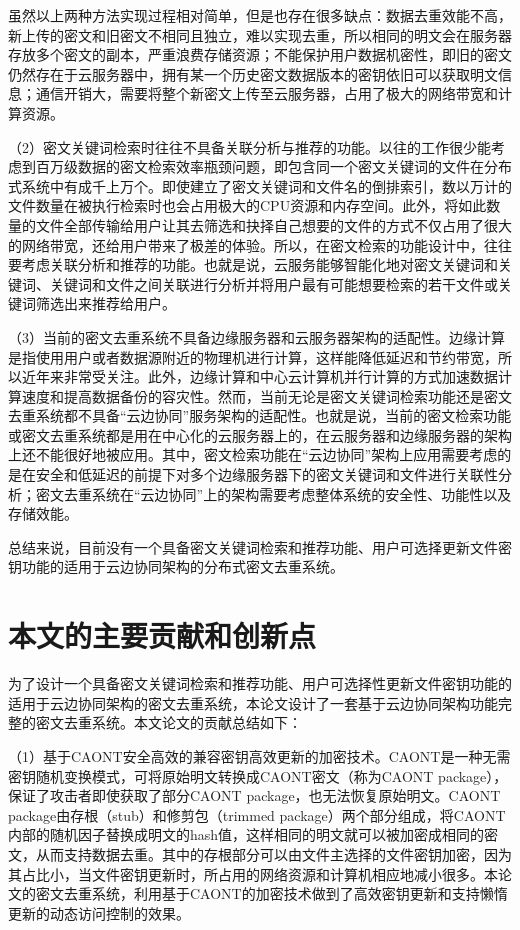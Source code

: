 \documentclass[promaster]{thesis-uestc}
\begin{document}
虽然以上两种方法实现过程相对简单，但是也存在很多缺点：数据去重效能不高，新上传的密文和旧密文不相同且独立，难以实现去重，所以相同的明文会在服务器存放多个密文的副本，严重浪费存储资源；不能保护用户数据机密性，即旧的密文仍然存在于云服务器中，拥有某一个历史密文数据版本的密钥依旧可以获取明文信息；通信开销大，需要将整个新密文上传至云服务器，占用了极大的网络带宽和计算资源。

（2）密文关键词检索时往往不具备关联分析与推荐的功能。以往的工作很少能考虑到百万级数据的密文检索效率瓶颈问题，即包含同一个密文关键词的文件在分布式系统中有成千上万个。即使建立了密文关键词和文件名的倒排索引，数以万计的文件数量在被执行检索时也会占用极大的CPU资源和内存空间。此外，将如此数量的文件全部传输给用户让其去筛选和抉择自己想要的文件的方式不仅占用了很大的网络带宽，还给用户带来了极差的体验。所以，在密文检索的功能设计中，往往要考虑关联分析和推荐的功能。也就是说，云服务能够智能化地对密文关键词和关键词、关键词和文件之间关联进行分析并将用户最有可能想要检索的若干文件或关键词筛选出来推荐给用户。

（3）当前的密文去重系统不具备边缘服务器和云服务器架构的适配性。边缘计算是指使用用户或者数据源附近的物理机进行计算，这样能降低延迟和节约带宽，所以近年来非常受关注。此外，边缘计算和中心云计算机并行计算的方式加速数据计算速度和提高数据备份的容灾性。然而，当前无论是密文关键词检索功能还是密文去重系统都不具备“云边协同”服务架构的适配性。也就是说，当前的密文检索功能或密文去重系统都是用在中心化的云服务器上的，在云服务器和边缘服务器的架构上还不能很好地被应用。其中，密文检索功能在“云边协同”架构上应用需要考虑的是在安全和低延迟的前提下对多个边缘服务器下的密文关键词和文件进行关联性分析；密文去重系统在“云边协同”上的架构需要考虑整体系统的安全性、功能性以及存储效能。

总结来说，目前没有一个具备密文关键词检索和推荐功能、用户可选择更新文件密钥功能的适用于云边协同架构的分布式密文去重系统。

\section{本文的主要贡献和创新点}\label{本文的主要贡献和创新点}
为了设计一个具备密文关键词检索和推荐功能、用户可选择性更新文件密钥功能的适用于云边协同架构的密文去重系统，本论文设计了一套基于云边协同架构功能完整的密文去重系统。本文论文的贡献总结如下：

（1）基于CAONT安全高效的兼容密钥高效更新的加密技术。CAONT是一种无需密钥随机变换模式，可将原始明文转换成CAONT密文（称为CAONT package），保证了攻击者即使获取了部分CAONT package，也无法恢复原始明文。CAONT package由存根（stub）和修剪包（trimmed package）两个部分组成，将CAONT内部的随机因子替换成明文的hash值，这样相同的明文就可以被加密成相同的密文，从而支持数据去重。其中的存根部分可以由文件主选择的文件密钥加密，因为其占比小，当文件密钥更新时，所占用的网络资源和计算机相应地减小很多。本论文的密文去重系统，利用基于CAONT的加密技术做到了高效密钥更新和支持懒惰更新的动态访问控制的效果。
\end{document}
